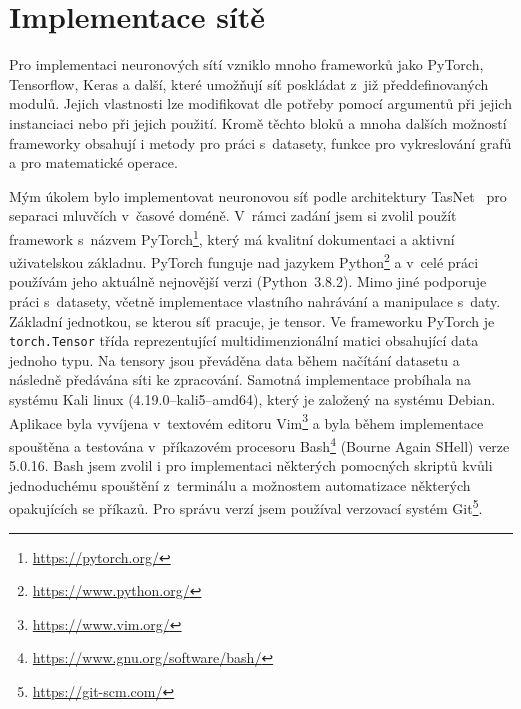 


\chapter{Implementace sítě}
\label{implementace}
Pro implementaci neuronových sítí vzniklo mnoho frameworků jako PyTorch, Tensorflow, Keras a další, které umožňují síť poskládat z~již předdefinovaných modulů. Jejich vlastnosti lze modifikovat dle potřeby pomocí argumentů při jejich instanciaci nebo při jejich použití. Kromě těchto bloků a mnoha dalších možností frameworky obsahují i metody pro práci s~datasety, funkce pro vykreslování grafů a pro matematické operace.

Mým úkolem bylo implementovat neuronovou síť podle architektury TasNet~\cite{luo2018convtasnet} pro separaci mluvčích v~časové doméně. V~rámci zadání jsem si zvolil použít framework s~názvem PyTorch\footnote{\url{https://pytorch.org/}}, který má kvalitní dokumentaci a aktivní uživatelskou základnu. PyTorch funguje nad jazykem Python\footnote{\url{https://www.python.org/}} a v~celé práci používám jeho aktuálně nejnovější verzi (Python~3.8.2). Mimo jiné podporuje práci s~datasety, včetně implementace vlastního nahrávání a manipulace s~daty. Základní jednotkou, se kterou síť pracuje, je tensor. Ve frameworku PyTorch je \texttt{torch.Tensor} třída reprezentující multidimenzionální matici obsahující data jednoho typu. Na tensory jsou převáděna data během načítání datasetu a následně předávána síti ke zpracování. Samotná implementace probíhala na systému Kali linux (4.19.0--kali5--amd64), který je založený na systému Debian. Aplikace byla vyvíjena v~textovém editoru Vim\footnote{\url{https://www.vim.org/}} a byla během implementace spouštěna a testována v~příkazovém procesoru Bash\footnote{\url{https://www.gnu.org/software/bash/}} (Bourne Again SHell) verze 5.0.16. Bash jsem zvolil i pro implementaci některých pomocných skriptů kvůli jednoduchému spouštění z~terminálu a možnostem automatizace některých opakujících se příkazů. Pro správu verzí jsem používal verzovací systém Git\footnote{\url{https://git-scm.com/}}.

